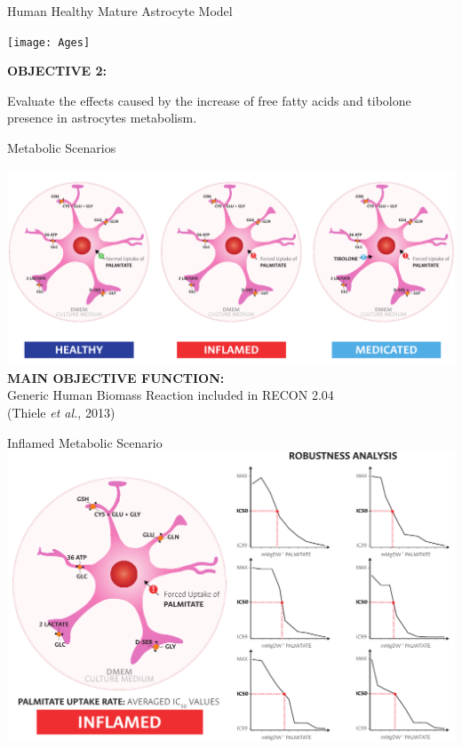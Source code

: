 \documentclass[11pt]{beamer}
\begin{document}
\begin{frame}{Human Healthy Mature Astrocyte Model}
\begin{center}
\texttt{[image: Ages]}
\end{center}
\end{frame}
\begin{frame}
\begin{block}{\textbf{OBJECTIVE 2:}}
\begin{center}
Evaluate the effects caused by the increase of free fatty acids and tibolone presence in astrocytes metabolism.\end{center}\end{block}
\end{frame}
\begin{frame}{Metabolic Scenarios}
\begin{center}
\includegraphics[width=\textwidth]{Healthy}\\
\textbf{MAIN OBJECTIVE FUNCTION:}\\Generic Human Biomass Reaction included in RECON 2.04 \\(Thiele \textit{et al.}, 2013)
\end{center}
\end{frame}
\begin{frame}{Inflamed Metabolic Scenario}
\includegraphics[width=\textwidth]{Inflamed}
\end{frame}
\end{document}
